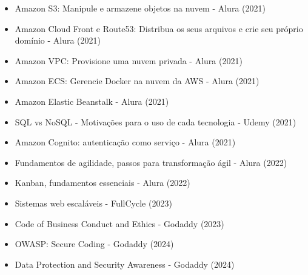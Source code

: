 \begin{itemize}
    \item Amazon S3: Manipule e armazene objetos na nuvem - Alura (2021)
    \item Amazon Cloud Front e Route53: Distribua os seus arquivos e crie seu próprio domínio - Alura (2021)
    \item Amazon VPC: Provisione uma nuvem privada - Alura (2021)
    \item Amazon ECS: Gerencie Docker na nuvem da AWS - Alura (2021)
    \item Amazon Elastic Beanstalk - Alura (2021)
    \item SQL vs NoSQL - Motivações para o uso de cada tecnologia - Udemy (2021)
    \item Amazon Cognito: autenticação como serviço - Alura (2021)
    \item Fundamentos de agilidade, passos para transformação ágil - Alura (2022)
    \item Kanban, fundamentos essenciais - Alura (2022)
    \item Sistemas web escaláveis - FullCycle (2023)
    \item Code of Business Conduct and Ethics - Godaddy (2023)
    \item OWASP: Secure Coding - Godaddy (2024)
    \item Data Protection and Security Awareness - Godaddy (2024)
\end{itemize}
